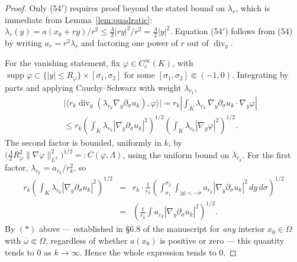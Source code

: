 \documentclass[11pt,letterpaper]{amsart}
\begin{document}
\begin{proof}
Only (54$'$) requires proof beyond the stated bound on $\lambda_r$, which is immediate from
Lemma~\ref{lem:quadratic}: $\lambda_r(y) = a(x_0+ry)/r^2 \le \frac{\Lambda}{2}|ry|^2/r^2
= \frac{\Lambda}{2}|y|^2$. Equation (54$'$) follows from (54) by writing
$a_r = r^2\lambda_r$ and factoring one power of $r$ out of $\operatorname{div}_y$.

For the vanishing statement, fix $\varphi\in C_c^\infty(K)$, with $\operatorname{supp}\varphi
\subset \{|y|\le R_\varphi\}\times[\sigma_1,\sigma_2]$ for some $[\sigma_1,\sigma_2]\Subset(-1,0)$.
Integrating by parts and applying Cauchy--Schwarz with weight $\lambda_{r_k}$,
\begin{eqnarray*}
&&\big|\langle r_k\operatorname{div}_y(\lambda_{r_k}\nabla_y\partial_\sigma u_k),\varphi\rangle\big|
= r_k\left|\int_K \lambda_{r_k}\,\nabla_y\partial_\sigma u_k\cdot\nabla_y\varphi\right|\\
&&\le r_k \left(\int_K \lambda_{r_k}|\nabla_y\partial_\sigma u_k|^2\right)^{1/2}
\left(\int_K \lambda_{r_k}|\nabla_y\varphi|^2\right)^{1/2}.
\end{eqnarray*}
The second factor is bounded, uniformly in $k$, by $\big(\tfrac{\Lambda}{2}R_\varphi^2
\|\nabla\varphi\|_{L^2}^2\big)^{1/2} =: C(\varphi,\Lambda)$, using the uniform bound on
$\lambda_{r_k}$. For the first factor, $\lambda_{r_k} = a_{r_k}/r_k^2$, so
\begin{eqnarray*}
r_k\left(\int_K \lambda_{r_k}|\nabla_y\partial_\sigma u_k|^2\right)^{1/2}
&=& r_k \cdot \frac{1}{r_k}\left(\int_{\sigma_1}^{\sigma_2}\int_{|y|<-\sigma}
a_{r_k}|\nabla_y\partial_\sigma u_k|^2\,dy\,d\sigma\right)^{1/2}\\
&=& \left(\frac{1}{r_k}\int a_{r_k}|\nabla_y\partial_\sigma u_k|^2\right)^{1/2}.
\end{eqnarray*}
By $(\ast)$ above — established in \S6.8 of the manuscript for \emph{any} interior
$x_0\in\Omega$ with $\overline\omega\Subset\Omega$, regardless of whether $a(x_0)$ is
positive or zero — this quantity tends to $0$ as $k\to\infty$. Hence the whole expression
tends to $0$.
\end{proof}
\end{document}
